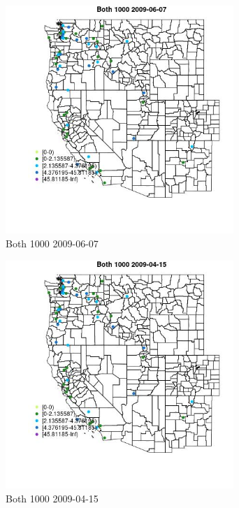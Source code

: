 \begin{figure} 
\centering  
\includegraphics[width=0.77\textwidth]{Code_Outputs/Report_ML_input_PM25_Step4_part_e_de_duplicated_aves_MapObsBoth_10002009-06-07.jpg} 
\caption{\label{fig:Report_ML_input_PM25_Step4_part_e_de_duplicated_avesMapObsBoth_10002009-06-07}Both 1000 2009-06-07} 
\end{figure} 
 

\begin{figure} 
\centering  
\includegraphics[width=0.77\textwidth]{Code_Outputs/Report_ML_input_PM25_Step4_part_e_de_duplicated_aves_MapObsBoth_10002009-04-15.jpg} 
\caption{\label{fig:Report_ML_input_PM25_Step4_part_e_de_duplicated_avesMapObsBoth_10002009-04-15}Both 1000 2009-04-15} 
\end{figure} 
 

